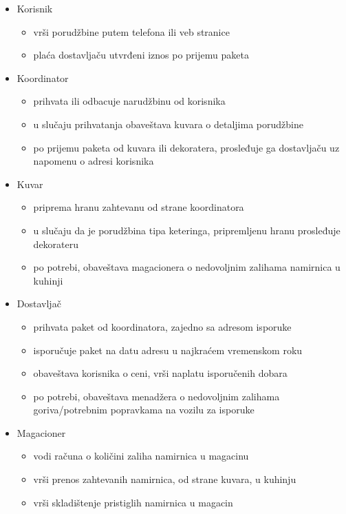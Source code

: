\begin{itemize}
    \item Korisnik
    \begin{itemize}
        \item vrši porudžbine putem telefona ili veb stranice
        \item plaća dostavljaču utvrđeni iznos po prijemu paketa
    \end{itemize}
    \item Koordinator
    \begin{itemize}
        \item prihvata ili odbacuje narudžbinu od korisnika
        \item u slučaju prihvatanja obaveštava kuvara o detaljima porudžbine
        \item po prijemu paketa od kuvara ili dekoratera, prosleđuje ga dostavljaču uz napomenu o adresi korisnika
    \end{itemize}
    \item Kuvar
    \begin{itemize}
        \item priprema hranu zahtevanu od strane koordinatora
        \item u slučaju da je porudžbina tipa keteringa, pripremljenu hranu prosleđuje dekorateru
        \item po potrebi, obaveštava magacionera o nedovoljnim zalihama namirnica u kuhinji
    \end{itemize}
    \item Dostavljač
    \begin{itemize}
        \item prihvata paket od koordinatora, zajedno sa adresom isporuke
        \item isporučuje paket na datu adresu u najkraćem vremenskom roku
        \item obaveštava korisnika o ceni, vrši naplatu isporučenih dobara
        \item po potrebi, obaveštava menadžera o nedovoljnim zalihama goriva/potrebnim popravkama na vozilu za isporuke
    \end{itemize}
    \item Magacioner
    \begin{itemize}
        \item vodi računa o količini zaliha namirnica u magacinu
        \item vrši prenos zahtevanih namirnica, od strane kuvara, u kuhinju
        \item vrši skladištenje pristiglih namirnica u magacin

\end{itemize}
\end{itemize}
